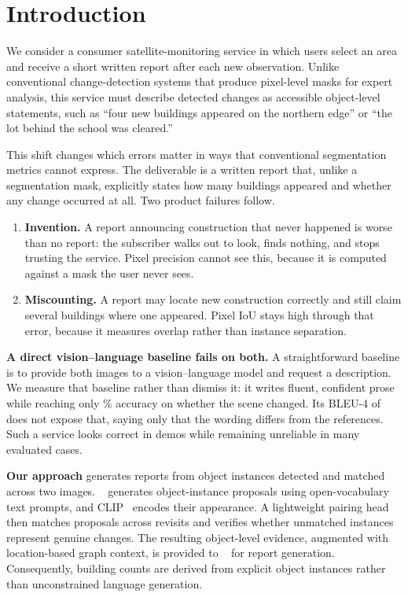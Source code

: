 \section{Introduction}

We consider a consumer satellite-monitoring service in which users select an
area and receive a short written report after each new observation. Unlike
conventional change-detection systems that produce pixel-level masks for expert
analysis, this service must describe detected changes as accessible object-level
statements, such as ``four new buildings appeared on the northern edge'' or
``the lot behind the school was cleared.''

This shift changes which errors matter in ways that conventional segmentation
metrics cannot express. The deliverable is a written report that, unlike a
segmentation mask, explicitly states how many buildings appeared and whether
any change occurred at all. Two product failures follow.

\begin{enumerate}
\item \textbf{Invention.} A report announcing construction that never happened
      is worse than no report: the subscriber walks out to look, finds nothing,
      and stops trusting the service. Pixel precision cannot see this, because
      it is computed against a mask the user never sees.
\item \textbf{Miscounting.} A report may locate new construction correctly and
      still claim several buildings where one appeared. Pixel IoU stays high
      through that error, because it measures overlap rather than instance
      separation.
\end{enumerate}

\textbf{A direct vision--language baseline fails on both.} A straightforward
baseline is to provide both images to a vision--language model and request a
description. We measure that baseline rather than dismiss it: it writes fluent,
confident prose while reaching only \EFourVLMChgAcc\% accuracy on whether the
scene changed. Its BLEU-4 of \EFourVLMBleu{} does not expose that, saying only
that the wording differs from the references. Such a service looks correct in
demos while remaining unreliable in many evaluated cases.

\textbf{Our approach} generates reports from object instances detected and
matched across two images. \DetectorName~\cite{sam3} generates object-instance
proposals using open-vocabulary text prompts, and CLIP~\cite{radford2021learning}
encodes their appearance. A lightweight pairing head then matches proposals
across revisits and verifies whether unmatched instances represent genuine
changes. The resulting object-level evidence, augmented with location-based
graph context, is provided to \LLMName~\cite{exaone4} for report generation.
Consequently, building counts are derived from explicit object instances rather
than unconstrained language generation.

